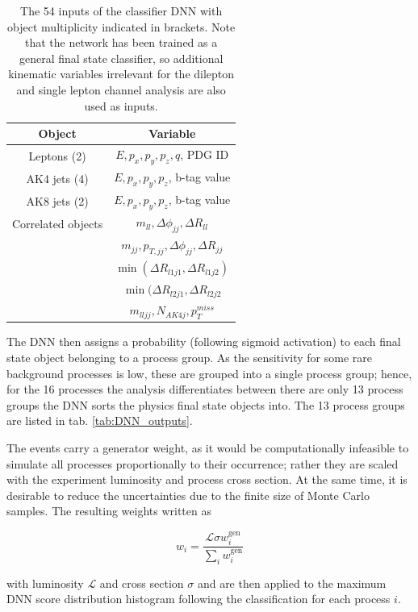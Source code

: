 \begin{table}[h!]
	\centering
	\begin{tabular}{cc}
		Object & Variable \\
		\hline
		Leptons (2) & $E, p_x, p_y, p_z, q$, PDG ID \\
		AK4 jets (4) & $E, p_x, p_y, p_z$, b-tag value \\
		AK8 jets (2) & $E, p_x, p_y, p_z$, b-tag value \\
		Correlated objects & $m_{ll}, \Delta\phi_{jj}, \Delta R_{ll}$ \\
		                   & $m_{jj}, p_{T, jj}, \Delta\phi_{jj}, \Delta R_{jj}$ \\
		                   & $\min(\Delta R_{l1j1}, \Delta R_{l1j2})$ \\
		                   & $\min(\Delta R_{l2j1}, \Delta R_{l2j2}$ \\
		                   & $m_{lljj}, N_{AK4j}, p^{miss}_T$
	\end{tabular}
	\caption{The 54 inputs of the classifier DNN with object multiplicity indicated in brackets. Note that the network has been trained as a general final state classifier, so additional kinematic variables irrelevant for the dilepton and single lepton channel analysis are also used as inputs.}
	\label{tab:DNN_inputs}
\end{table}

The DNN then assigns a probability (following sigmoid activation) to each final state object belonging to a process group. As the sensitivity for some rare background processes is low, these are grouped into a single process group; hence, for the 16 processes the analysis differentiates between there are only 13 process groups the DNN sorts the physics final state objects into. The 13 process groups are listed in tab. \ref{tab:DNN_outputs}.

The events carry a generator weight, as it would be computationally infeasible to simulate all processes proportionally to their occurrence; rather they are scaled with the experiment luminosity and process cross section. At the same time, it is desirable to reduce the uncertainties due to the finite size of Monte Carlo samples. The resulting weights written as

\begin{equation*}
	w_i = \frac{\mathcal{L}\sigma w^\text{gen}_i}{\sum\limits_i w^\text{gen}_i}
\end{equation*}

with luminosity $\mathcal{L}$ and cross section $\sigma$ and are then applied to the maximum DNN score distribution histogram following the classification for each process $i$.

